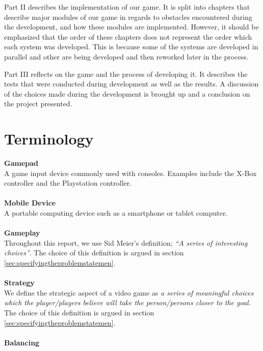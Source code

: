 Part II describes the implementation of our game.
It is split into chapters that describe major modules of our game in regards to obstacles encountered during the development, and how these modules are implemented.
However, it should be emphasized that the order of these chapters does not represent the order which each system was developed.
This is because some of the systems are developed in parallel and other are being developed and then reworked later in the process.

Part III reflects on the game and the process of developing it. It describes the tests that were conducted during development as well as the results. A discussion of the choices made during the development is brought up and a conclusion on the project presented.

\section*{Terminology}\label{preface:terminology}
\textbf{Gamepad}\vspace{4pt}\\
A game input device commonly used with consoles.
Examples include the X-Box controller and the Playstation controller.\\
\\
\textbf{Mobile Device}\vspace{4pt}\\
A portable computing device such as a smartphone or tablet computer.\cite{mobileOx}\\
\\
\textbf{Gameplay}\vspace{4pt}\\
Throughout this report, we use Sid Meier's definition; \textit{``A series of interesting choices''}\cite{GDC2012}.
The choice of this definition is argued in section \ref{sec:specifyingtheproblemstatemen}.\\
\\
\textbf{Strategy}\vspace{4pt}\\
We define the strategic aspect of a video game as \emph{a series of meaningful choices which the player/players believe will take the person/persons closer to the goal.}
The choice of this definition is argued in section \ref{sec:specifyingtheproblemstatemen}.\\
\\
\textbf{Balancing}\vspace{4pt}\\
